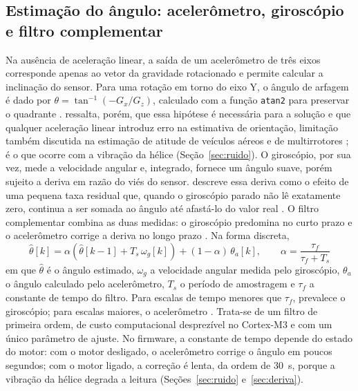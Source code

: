 \subsection{Estimação do ângulo: acelerômetro, giroscópio e filtro complementar}

Na ausência de aceleração linear, a saída de um acelerômetro de três eixos corresponde apenas ao vetor da gravidade rotacionado e permite calcular a inclinação do sensor. Para uma rotação em torno do eixo Y, o ângulo de arfagem é dado por $\theta=\tan^{-1}\left(-G_x/G_z\right)$, calculado com a função \texttt{atan2} para preservar o quadrante \cite{nxpan3461}.  ressalta, porém, que essa hipótese é necessária para a solução e que qualquer aceleração linear introduz erro na estimativa de orientação, limitação também discutida na estimação de atitude de veículos aéreos \cite[p.~147--149]{beard2012} e de multirrotores \cite[p.~149]{quan2017}; é o que ocorre com a vibração da hélice (Seção~\ref{sec:ruido}). O giroscópio, por sua vez, mede a velocidade angular e, integrado, fornece um ângulo suave, porém sujeito a deriva em razão do viés do sensor.  descreve essa deriva como o efeito de uma pequena taxa residual que, quando o giroscópio parado não lê exatamente zero, continua a ser somada ao ângulo até afastá-lo do valor real \cite[p.~9--10]{colton2007}. O filtro complementar combina as duas medidas: o giroscópio predomina no curto prazo e o acelerômetro corrige a deriva no longo prazo \cite[p.~14]{colton2007}. Na forma discreta,
\begin{equation}
 \hat\theta[k]=\alpha\left(\hat\theta[k-1]+T_s\,\omega_g[k]\right)+(1-\alpha)\,\theta_a[k],\qquad \alpha=\frac{\tau_f}{\tau_f+T_s}
 \label{eq:complementar}
\end{equation}
em que $\hat\theta$ é o ângulo estimado, $\omega_g$ a velocidade angular medida pelo giroscópio, $\theta_a$ o ângulo calculado pelo acelerômetro, $T_s$ o período de amostragem e $\tau_f$ a constante de tempo do filtro. Para escalas de tempo menores que $\tau_f$, prevalece o giroscópio; para escalas maiores, o acelerômetro \cite[p.~13--14]{colton2007}. Trata-se de um filtro de primeira ordem, de custo computacional desprezível no Cortex-M3 e com um único parâmetro de ajuste. No firmware, a constante de tempo depende do estado do motor: com o motor desligado, o acelerômetro corrige o ângulo em poucos segundos; com o motor ligado, a correção é lenta, da ordem de 30~s, porque a vibração da hélice degrada a leitura (Seções~\ref{sec:ruido} e~\ref{sec:deriva}).

